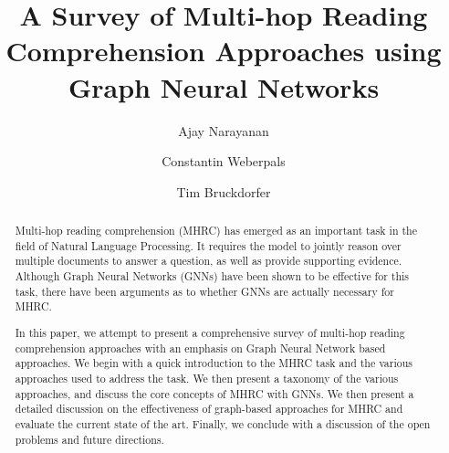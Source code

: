 \documentclass[sigplan,screen,nonacm]{acmart}
\begin{document}
\title{A Survey of Multi-hop Reading Comprehension Approaches using Graph Neural Networks}

\author{Ajay Narayanan}

\author{Constantin Weberpals}

\author{Tim Bruckdorfer}



\begin{abstract}
  Multi-hop reading comprehension (MHRC)  has emerged as an important task in the field of Natural Language Processing. It requires the model to 
  jointly reason over multiple documents to answer a question, as well as provide supporting evidence. Although Graph Neural Networks (GNNs) 
  have been shown to be effective for this task, there have been arguments as to whether GNNs are actually necessary for MHRC.

  In this paper, we attempt to present a comprehensive survey of multi-hop reading comprehension approaches with an emphasis on 
  Graph Neural Network based approaches. We begin with a quick introduction to the MHRC task and the various approaches used to address
  the task. We then present a taxonomy of the various approaches, and discuss the core concepts of MHRC with GNNs. We then present a detailed 
  discussion on the effectiveness of graph-based approaches for MHRC and evaluate the current state of the art. Finally, we conclude with a 
  discussion of the open problems and future directions.
\end{abstract}

\maketitle
\end{document}
